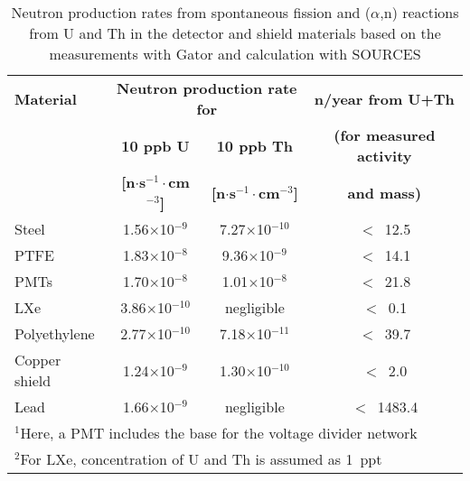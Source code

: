 \begin{table}[h!]
\centering
\caption{Neutron production rates from spontaneous fission and ($\alpha$,n)
  reactions from U and Th in the detector and shield materials based on the measurements with Gator and calculation with SOURCES}
\label{tab:rate-sources}
\vspace{0.3cm}
\begin{tabular}{lccc}
\hline
\bf{Material} & \multicolumn{2}{c}{\bf{Neutron production rate for}} & \bf{n/year from U+Th} \\
         & \bf{10 ppb U}  & \bf{10 ppb Th}  & \bf{(for measured activity}\\
       & \bf{[n$\cdot$s$^{-1}\cdot$cm$^{-3}$]} & \bf{[n$\cdot$s$^{-1}\cdot$cm$^{-3}$]} & \bf{and mass)} \\
\hline
Steel &  1.56$\times$10$^{-9}$ & 7.27$\times$10$^{-10}$& $<$~12.5\\
PTFE & 1.83$\times$10$^{-8}$ & 9.36$\times$10$^{-9}$ & $<$~14.1\\
PMTs\footnotemark[1]  & 1.70$\times$10$^{-8}$ & 1.01$\times$10$^{-8}$ & $<$~21.8\\
LXe\footnotemark[2] &   3.86$\times$10$^{-10}$ & negligible & $<$~0.1\\
Polyethylene 	& 2.77$\times$10$^{-10}$ & 7.18$\times$10$^{-11}$& $<$~39.7 \\
Copper shield &  1.24$\times$10$^{-9}$ & 1.30$\times$10$^{-10}$& $<$~2.0	 \\
Lead &   1.66$\times$10$^{-9}$ &   negligible & $<$~1483.4  \\
\hline
\multicolumn{4}{l}{\footnotesize{$^1$Here, a PMT includes the base for the voltage divider network}} \\
\multicolumn{4}{l}{\footnotesize{$^2$For LXe, concentration of U and Th is assumed as 1~ppt}} \\
\end{tabular}
\end{table}
 
